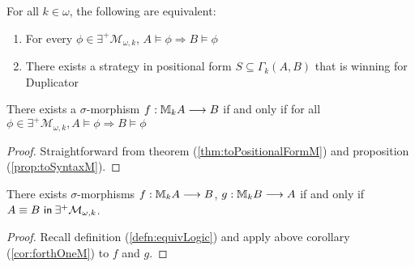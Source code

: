 \begin{prop}
For all $k \in \omega$, the following are equivalent:
\begin{enumerate}[label=(\arabic*)$_{k}$]
\item For every $\phi \in \exists^{+}\mathcal{M}_{\omega,k}$, $A \vDash \phi \Rightarrow B \vDash \phi$
\item There exists a strategy in positional form $S \subseteq \Gamma_{k}(A,B)$ that is winning for Duplicator 
\end{enumerate}
\begin{cor}
There exists a $\sigma$-morphism $f:{\mathbb{M}_{k}A} \longrightarrow B$ if and only if for all $\phi \in \exists^{+}\mathcal{M}_{\omega,k}, A \vDash \phi \Rightarrow B \vDash \phi$
\begin{proof}
Straightforward from theorem (\ref{thm:toPositionalFormM}) and proposition (\ref{prop:toSyntaxM}).
\end{proof}
\label{cor:forthOneM}
\end{cor}
\begin{cor}
There exists $\sigma$-morphisms $f:{\mathbb{M}_{k}A} \longrightarrow B$, $g:{\mathbb{M}_{k}B} \longrightarrow A$ if and only if ${A \equiv B \ \mathsf{in}\: \exists^{+}\mathcal{M}_{\omega,k}}$. 
\begin{proof}
Recall definition (\ref{defn:equivLogic}) and apply above corollary (\ref{cor:forthOneM}) to $f$ and $g$.  
\end{proof}
\label{cor:forthM}
\end{cor}
\label{prop:toSyntaxM}
\end{prop}
